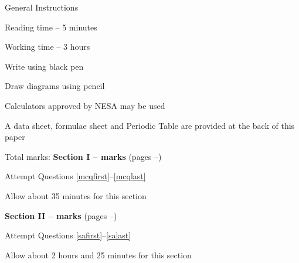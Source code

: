 \documentclass{src/hsc}
\begin{document}
\color{blue}

\maketitle

\begin{infobox}{General Instructions}
    \begin{infoitems}
        \item Reading time -- 5 minutes
        \item Working time -- 3 hours
        \item Write using black pen
        \item Draw diagrams using pencil
        \item Calculators approved by NESA may be used
        \item A data sheet, formulae sheet and Periodic Table are provided at the back of this paper
    \end{infoitems}
\end{infobox}

\begin{infobox}{Total marks:\linebreak \totalpoints}
    \textbf{Section I --  marks} (pages \pageref{mcqfirst}--\pageref{mcqlast})
    \begin{infoitems}
        \item Attempt Questions \ref{mcqfirst}--\ref{mcqlast}
        \item Allow about 35 minutes for this section
    \end{infoitems}
    \textbf{Section II --  marks} (pages \pageref{safirst}--\pageref{salast})
    \begin{infoitems}
        \item Attempt Questions \ref{safirst}--\ref{salast}
        \item Allow about 2 hours and 25 minutes for this section
    \end{infoitems}
\end{infobox}


\startsectionone

\end{document}
